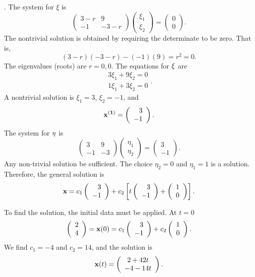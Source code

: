 \documentclass[leqno,DIV=calc,paper=a4,fontsize=11pt]{article}
\theoremstyle{definition}
\theoremstyle{plain}
\theoremstyle{remark}
\begin{document}
\vspace{.15in}
. The system for $\xi$ is
\[
\left(
\begin{array}{cc}3-r&9\\-1&-3-r\end{array}
\right)\left(\begin{array}{c}\xi_1\\ \xi_2\end{array}\right)=
\left(\begin{array}{c}0\\0\end{array}\right).
\]
The nontrivial solution is obtained by requiring the determinate to
be zero. That is,
\[
(3-r)(-3-r)-(-1)(9)= r^2=0.
\]
The eigenvalues (roots) are $r=0,0$. The equations for ${\bf\xi}$ are
\[
\begin{array}{c}3\xi_1+9\xi_2=0\\1\xi_1+3\xi_2=0\end{array}.
\]
A nontrivial solution is $\xi_1=3$, $\xi_2=-1$, and
\[
{\bf x^{(1)}}=\left(\begin{array}{r}3\\-1\end{array}\right).
\]
The system for ${\bf\eta}$ is
\[
\left(
\begin{array}{cc}3&9\\-1&-3\end{array}
\right)\left(\begin{array}{c}\eta_1\\ \eta_2\end{array}\right)=
\left(\begin{array}{r}3\\-1\end{array}\right).
\]
Any non-trivial solution be sufficient. The choice $\eta_2=0$ and
$\eta_1=1$ is a solution. Therefore, the general solution is
\[
{\bf x}=c_1\left(\begin{array}{r}3\\-1\end{array}\right)+
c_2\left[t\left(\begin{array}{r}3\\-1\end{array}\right)+
\left(\begin{array}{r}1\\0\end{array}\right)\right].
\]

To find the solution, the initial data must be applied. At $t=0$
\[
\left(\begin{array}{c}2\\4\end{array}\right)=
{\bf x}(0)=c_1\left(\begin{array}{r}3\\-1\end{array}\right)+
c_2\left(\begin{array}{r}1\\0\end{array}\right).
\]
We find $c_1=-4$ and $c_2=14$, and the solution is
\[
{\bf x}(t)=\left(\begin{array}{c}2+42t\\-4-14t\end{array}\right).
\]
\end{document}
